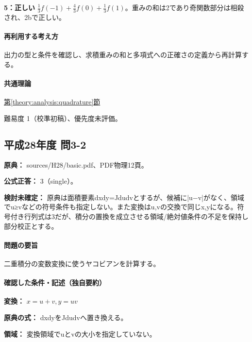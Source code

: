 \noindent\textbf{5：正しい} \(\frac13f(-1)+\frac43f(0)+\frac13f(1)\)。重みの和は2であり奇関数部分は相殺され、2bで正しい。\par

\paragraph{再利用する考え方} 出力の型と条件を確認し、求積重みの和と多項式への正確さの定義から再計算する。

\paragraph{共通理論} \hyperref[theory:analysis:quadrature]{第\ref*{theory:analysis:quadrature}節}

\par 難易度 1（校準初稿）、優先度未評価。

\subsection{平成28年度 問3-2}
\label{q:h28-reg-basic-3-2}

\noindent\textbf{原典：} sources/H28/basic.pdf、PDF物理12頁。

\textbf{公式正答：} 3（single）。

\par\textbf{検討未確定：} 原典は面積要素dxdy=\allowbreak{}Jdudvとするが、候補に|u−v|がなく、領域でu≥vなどの符号条件も指定しない。また変換はu,vの交換で同じx,yになる。符号付き行列式は3だが、積分の置換を成立させる領域/絶対値条件の不足を保持し部分校正とする。

\paragraph{問題の要旨} 二重積分の変数変換に使うヤコビアンを計算する。

\paragraph{確認した条件・記述（独自要約）}\mbox{}\par

\noindent\textbf{変換：} \(x=u+v,y=uv\)\par

\noindent\textbf{原典の式：} dxdyをJdudvへ置き換える。\par

\noindent\textbf{領域：} 変換領域でuとvの大小を指定していない。\par

